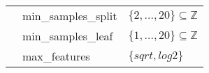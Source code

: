 \begin{table}[ht]
\begin{tabular}{|p{1.5cm}|l|l|}
                            & min\_samples\_split         &  $\{2,...,20\} \subseteq \mathbb{Z}$                                      \\ \cline{2-3}
                            & min\_samples\_leaf          &  $\{1,...,20\} \subseteq \mathbb{Z}$                                      \\ \cline{2-3}
                            & max\_features              & $\{ sqrt, log2\}$                            \\ \hline
\end{tabular}
\end{table}
